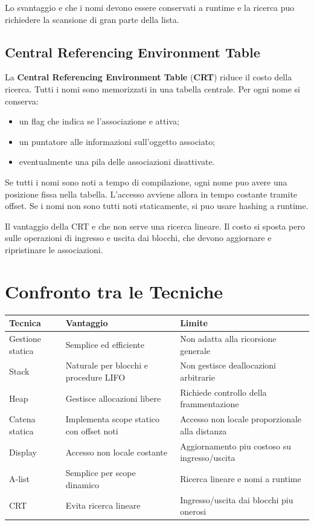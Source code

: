 \documentclass{article}
\begin{document}
Lo svantaggio e che i nomi devono essere conservati a runtime e la ricerca puo richiedere la scansione di gran parte della lista.

\subsection{Central Referencing Environment Table}

La \textbf{Central Referencing Environment Table} (\textbf{CRT}) riduce il costo della ricerca. Tutti i nomi sono memorizzati in una tabella centrale. Per ogni nome si conserva:

\begin{itemize}
  \item un flag che indica se l'associazione e attiva;
  \item un puntatore alle informazioni sull'oggetto associato;
  \item eventualmente una pila delle associazioni disattivate.
\end{itemize}

Se tutti i nomi sono noti a tempo di compilazione, ogni nome puo avere una posizione fissa nella tabella. L'accesso avviene allora in tempo costante tramite offset. Se i nomi non sono tutti noti staticamente, si puo usare hashing a runtime.

Il vantaggio della CRT e che non serve una ricerca lineare. Il costo si sposta pero sulle operazioni di ingresso e uscita dai blocchi, che devono aggiornare e ripristinare le associazioni.

\section{Confronto tra le Tecniche}

\begin{center}
\begin{tabular}{|l|l|l|}
\hline
\textbf{Tecnica} & \textbf{Vantaggio} & \textbf{Limite} \\
\hline
Gestione statica & Semplice ed efficiente & Non adatta alla ricorsione generale \\
\hline
Stack & Naturale per blocchi e procedure LIFO & Non gestisce deallocazioni arbitrarie \\
\hline
Heap & Gestisce allocazioni libere & Richiede controllo della frammentazione \\
\hline
Catena statica & Implementa scope statico con offset noti & Accesso non locale proporzionale alla distanza \\
\hline
Display & Accesso non locale costante & Aggiornamento piu costoso su ingresso/uscita \\
\hline
A-list & Semplice per scope dinamico & Ricerca lineare e nomi a runtime \\
\hline
CRT & Evita ricerca lineare & Ingresso/uscita dai blocchi piu onerosi \\
\hline
\end{tabular}
\end{center}
\end{document}
